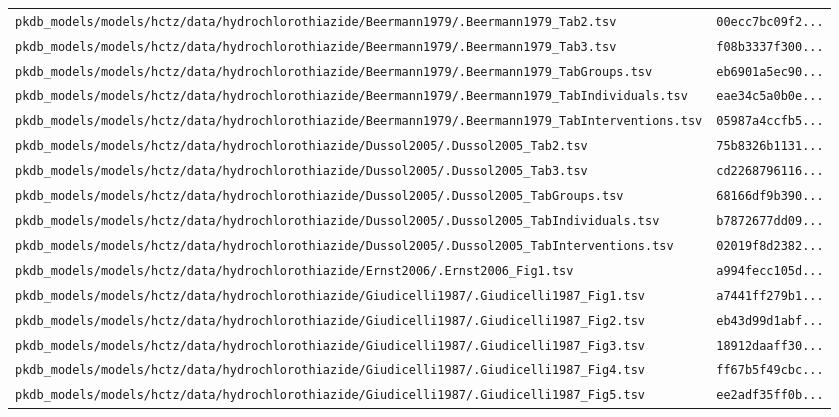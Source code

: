 \documentclass{article}
\begin{document}
\begin{longtable}{ll}
\texttt{pkdb\_models/models/hctz/data/hydrochlorothiazide/Beermann1979/.Beermann1979\_Tab2.tsv} & \texttt{00ecc7bc09f2...} \\
\texttt{pkdb\_models/models/hctz/data/hydrochlorothiazide/Beermann1979/.Beermann1979\_Tab3.tsv} & \texttt{f08b3337f300...} \\
\texttt{pkdb\_models/models/hctz/data/hydrochlorothiazide/Beermann1979/.Beermann1979\_TabGroups.tsv} & \texttt{eb6901a5ec90...} \\
\texttt{pkdb\_models/models/hctz/data/hydrochlorothiazide/Beermann1979/.Beermann1979\_TabIndividuals.tsv} & \texttt{eae34c5a0b0e...} \\
\texttt{pkdb\_models/models/hctz/data/hydrochlorothiazide/Beermann1979/.Beermann1979\_TabInterventions.tsv} & \texttt{05987a4ccfb5...} \\
\texttt{pkdb\_models/models/hctz/data/hydrochlorothiazide/Dussol2005/.Dussol2005\_Tab2.tsv} & \texttt{75b8326b1131...} \\
\texttt{pkdb\_models/models/hctz/data/hydrochlorothiazide/Dussol2005/.Dussol2005\_Tab3.tsv} & \texttt{cd2268796116...} \\
\texttt{pkdb\_models/models/hctz/data/hydrochlorothiazide/Dussol2005/.Dussol2005\_TabGroups.tsv} & \texttt{68166df9b390...} \\
\texttt{pkdb\_models/models/hctz/data/hydrochlorothiazide/Dussol2005/.Dussol2005\_TabIndividuals.tsv} & \texttt{b7872677dd09...} \\
\texttt{pkdb\_models/models/hctz/data/hydrochlorothiazide/Dussol2005/.Dussol2005\_TabInterventions.tsv} & \texttt{02019f8d2382...} \\
\texttt{pkdb\_models/models/hctz/data/hydrochlorothiazide/Ernst2006/.Ernst2006\_Fig1.tsv} & \texttt{a994fecc105d...} \\
\texttt{pkdb\_models/models/hctz/data/hydrochlorothiazide/Giudicelli1987/.Giudicelli1987\_Fig1.tsv} & \texttt{a7441ff279b1...} \\
\texttt{pkdb\_models/models/hctz/data/hydrochlorothiazide/Giudicelli1987/.Giudicelli1987\_Fig2.tsv} & \texttt{eb43d99d1abf...} \\
\texttt{pkdb\_models/models/hctz/data/hydrochlorothiazide/Giudicelli1987/.Giudicelli1987\_Fig3.tsv} & \texttt{18912daaff30...} \\
\texttt{pkdb\_models/models/hctz/data/hydrochlorothiazide/Giudicelli1987/.Giudicelli1987\_Fig4.tsv} & \texttt{ff67b5f49cbc...} \\
\texttt{pkdb\_models/models/hctz/data/hydrochlorothiazide/Giudicelli1987/.Giudicelli1987\_Fig5.tsv} & \texttt{ee2adf35ff0b...} \\

\end{longtable}
\end{document}
